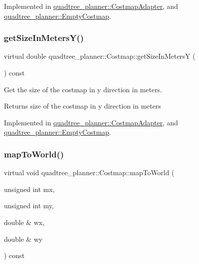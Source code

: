 Implemented in \hyperlink{classquadtree__planner_1_1CostmapAdapter_a360c5f4047437c2fb69b91e598e0aecf}{quadtree\+\_\+planner\+::\+Costmap\+Adapter}, and \hyperlink{classquadtree__planner_1_1EmptyCostmap_ae7bbb00b36630b65f3e5d5d55a519fdd}{quadtree\+\_\+planner\+::\+Empty\+Costmap}.

\mbox{\label{classquadtree__planner_1_1Costmap_ac0767c6851d243d8d12a8a0dbd2d022b}} 
\subsubsection{\texorpdfstring{get\+Size\+In\+Meters\+Y()}{getSizeInMetersY()}}
{\footnotesize\ttfamily virtual double quadtree\+\_\+planner\+::\+Costmap\+::get\+Size\+In\+MetersY (\begin{DoxyParamCaption}{ }\end{DoxyParamCaption}) const\hspace{0.3cm}{\ttfamily [pure virtual]}}



Get the size of the costmap in y direction in meters. 

\begin{DoxyReturn}{Returns}
size of the costmap in y direction in meters 
\end{DoxyReturn}


Implemented in \hyperlink{classquadtree__planner_1_1CostmapAdapter_aa253651d1b4596009ca26009e7ad28f8}{quadtree\+\_\+planner\+::\+Costmap\+Adapter}, and \hyperlink{classquadtree__planner_1_1EmptyCostmap_aec6c2b1a739b6475f21219d688bc0b54}{quadtree\+\_\+planner\+::\+Empty\+Costmap}.

\mbox{\label{classquadtree__planner_1_1Costmap_af82ccc7c15bd2cb9092e002ac6998eba}} 
\subsubsection{\texorpdfstring{map\+To\+World()}{mapToWorld()}}
{\footnotesize\ttfamily virtual void quadtree\+\_\+planner\+::\+Costmap\+::map\+To\+World (\begin{DoxyParamCaption}\item[{unsigned int}]{mx,  }\item[{unsigned int}]{my,  }\item[{double \&}]{wx,  }\item[{double \&}]{wy }\end{DoxyParamCaption}) const\hspace{0.3cm}{\ttfamily [pure virtual]}}



